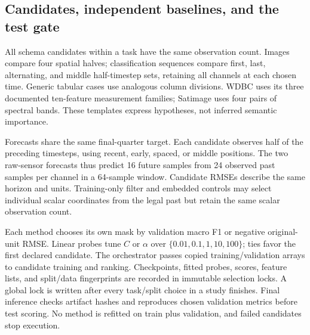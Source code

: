 \documentclass{article}
\begin{document}
\subsection{Candidates, independent baselines, and the test gate}
All schema candidates within a task have the same observation count. Images compare four spatial halves; classification sequences compare first, last, alternating, and middle half-timestep sets, retaining all channels at each chosen time. Generic tabular cases use analogous column divisions. WDBC uses its three documented ten-feature measurement families; Satimage uses four pairs of spectral bands. These templates express hypotheses, not inferred semantic importance.

Forecasts share the same final-quarter target. Each candidate observes half of the preceding timesteps, using recent, early, spaced, or middle positions. The two raw-sensor forecasts thus predict 16 future samples from 24 observed past samples per channel in a 64-sample window. Candidate RMSEs describe the same horizon and units. Training-only filter and embedded controls may select individual scalar coordinates from the legal past but retain the same scalar observation count.

Each method chooses its own mask by validation macro F1 or negative original-unit RMSE. Linear probes tune $C$ or $\alpha$ over $\{0.01,0.1,1,10,100\}$; ties favor the first declared candidate. The orchestrator passes copied training/validation arrays to candidate training and ranking. Checkpoints, fitted probes, scores, feature lists, and split/data fingerprints are recorded in immutable selection locks. A global lock is written after every task/split choice in a study finishes. Final inference checks artifact hashes and reproduces chosen validation metrics before test scoring. No method is refitted on train plus validation, and failed candidates stop execution.
\end{document}
